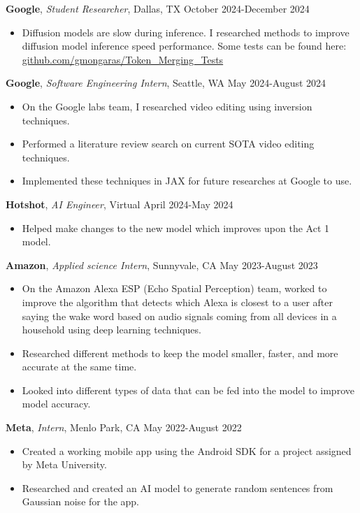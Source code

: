 \documentclass[a4paper,10pt]{article}
\begin{document}
\noindent\textbf{Google}, \textit{Student Researcher}, Dallas, TX \hfill October 2024-December 2024
\begin{itemize}[noitemsep,topsep=0pt]
  \item Diffusion models are slow during inference. I researched methods to improve diffusion model inference speed performance. Some tests can be found here: \href{https://github.com/gmongaras/Token_Merging_Tests}{github.com/gmongaras/Token\_Merging\_Tests}
\end{itemize}

\noindent\textbf{Google}, \textit{Software Engineering Intern}, Seattle, WA \hfill May 2024-August 2024
\begin{itemize}[noitemsep,topsep=0pt]
  \item On the Google labs team, I researched video editing using inversion techniques.
  \item Performed a literature review search on current SOTA video editing techniques.
  \item Implemented these techniques in JAX for future researches at Google to use.
\end{itemize}

\noindent\textbf{Hotshot}, \textit{AI Engineer}, Virtual \hfill April 2024-May 2024
\begin{itemize}[noitemsep,topsep=0pt]
  \item Helped make changes to the new model which improves upon the Act 1 model.
\end{itemize}

\noindent\textbf{Amazon}, \textit{Applied science Intern}, Sunnyvale, CA \hfill May 2023-August 2023
\begin{itemize}[noitemsep,topsep=0pt]
  \item On the Amazon Alexa ESP (Echo Spatial Perception) team, worked to improve the algorithm that detects which Alexa is closest to a user after saying the wake word based on audio signals coming from all devices in a household using deep learning techniques.
  \item Researched different methods to keep the model smaller, faster, and more accurate at the same time.
  \item Looked into different types of data that can be fed into the model to improve model accuracy.
\end{itemize}

\noindent\textbf{Meta}, \textit{Intern}, Menlo Park, CA \hfill May 2022-August 2022
\begin{itemize}[noitemsep,topsep=0pt]
  \item Created a working mobile app using the Android SDK for a project assigned by Meta University.
  \item Researched and created an AI model to generate random sentences from Gaussian noise for the app.
\end{itemize}
\end{document}
